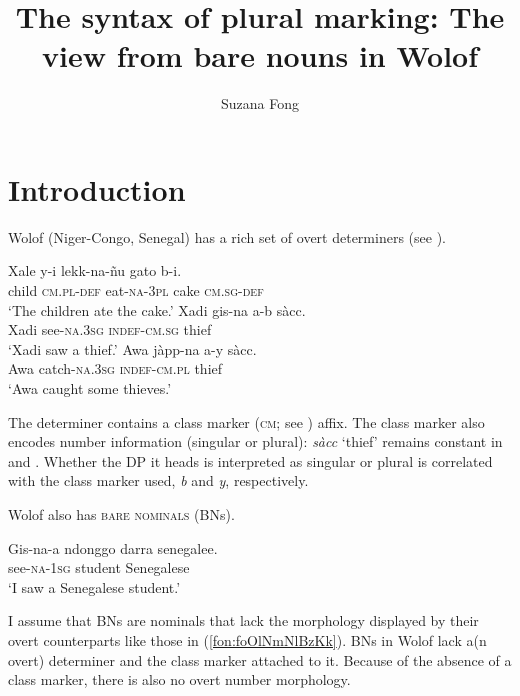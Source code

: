 \documentclass[output=paper]{langscibook}
\author{Suzana Fong\affiliation{Massachusetts Institute of Technology}}
\title{The syntax of plural marking: The view from bare nouns in Wolof}
\begin{document}
\maketitle

\section{Introduction}
	
Wolof (Niger-Congo, Senegal) has a rich set of overt determiners (see \citealt{ttz2012wolofQuatif}).
		
\ea \label{fon:foOlNmNlBzKk}
    \ea \gll	Xale y-i lekk-na-\~{n}u gato b-i.\\
				child \textsc{cm.pl-def} eat-\textsc{na-3pl} cake \textsc{cm.sg-def}\\
		\glt    `The children ate the cake.'
    \ex \gll	Xadi gis-na a-b sàcc.\\
				Xadi see-\textsc{na.3sg} \textsc{indef-cm.sg} thief\\
		\glt    `Xadi saw a thief.'\label{fon:foOlNmNlBzKk2}
	\ex \gll	Awa jàpp-na a-y sàcc.\\
				Awa catch-\textsc{na.3sg} \textsc{indef-cm.pl} thief\\
		\glt    `Awa caught some thieves.'\\\label{fon:foOlNmNlBzKk3}
	\sn \hfill \citep[(2a/32a/33b); glosses adapted for uniformity]{ttz2012wolofQuatif}
    \z
\z
		
\noindent   The determiner contains a class marker (\textsc{cm}; see \citealt{loporcaroBabou16}) affix. The class marker also encodes number information (singular or plural): \textit{sàcc} `thief' remains constant in  and . Whether the DP it heads is interpreted as singular or plural is correlated with the class marker used, \textit{b} and \textit{y}, respectively.
	
Wolof also has \textsc{bare nominals} (BNs).
	
	\ea
		\gll	Gis-na-a {ndonggo darra} senegalee.\\
			see-\textsc{na-1sg} student Senegalese\\
		\glt    `I saw a Senegalese student.'\label{fon:pLlfAwS}
	\z
	
\noindent   I assume that BNs are nominals that lack the morphology displayed by their overt counterparts like those in (\ref{fon:foOlNmNlBzKk}). BNs in Wolof lack a(n overt) determiner and the class marker attached to it. Because of the absence of a class marker, there is also no overt number morphology.
	
\end{document}
